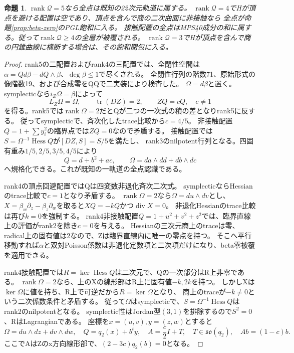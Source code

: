 \documentclass[a4paper,11pt]{ltjsarticle}
\newtheorem{proposition}{命題}[section]
\theoremstyle{definition}
\newcommand{\rank}{\operatorname{rank}}
\begin{document}
\begin{proposition}\label{prop:double-quadric}
$\rank\mathcal Q=5$なら全点は既知の22次元軌道に属する。
$\rank\mathcal Q=4$でHが頂点を避ける配置は空であり、頂点を含んで商の二次曲面に非接触なら
全点が命題\ref{prop:beta-zero}のPGL飽和に入る。
接触配置の全点はMPS40成分の和に属する。従って$\rank\mathcal Q\ge4$の全層が被覆される。
$\rank\mathcal Q=3$でHが頂点を含んで商の円錐曲線に横断する場合は、その飽和閉包に入る。
\end{proposition}
\begin{proof}
rank5の二配置およびrank4の三配置では、全閉性空間は
$\alpha=Qd\beta-dQ\wedge\beta$、$\deg\beta\le1$で尽くされる。
全閉性行列の階数71、原始形式の像階数19、および合成零をQQで二実装により検査した。
$\Omega=d\beta$と置く。symplecticなら$i_Z\Omega=\beta$によって
\[
 L_Z\Omega=\Omega,\qquad \operatorname{tr}(DZ)=2,\qquad ZQ=cQ,\quad c\ne1
\]
を得る。rank5では$\rank\Omega=2$だとQが二つの一次式の積の差となりrank5に反する。
従ってsymplecticで、斉次化したtrace比較から$c=4/5$。
非接触配置$Q=1+\sum y_i^2$の臨界点では$ZQ=0$なので矛盾する。
接触配置では$S=\Omega^{-1}\operatorname{Hess}Q$が$[DZ,S]=S/5$を満たし、
rank3のnilpotent行列となる。四固有重み$1/5,2/5,3/5,4/5$により
\[
 Q=d+b^2+ac,\qquad \Omega=da\wedge dd+db\wedge dc
\]
へ規格化できる。これが既知の一軌道の全点認識である。

rank4の頂点回避配置ではQは四変数非退化斉次二次式。
symplecticならHessianのtrace比較で$c=1$となり矛盾する。
$\rank\Omega=2$なら$\Omega=du\wedge dv$とし、
$X=\beta_w\partial_z-\beta_z\partial_w$を取ると$XQ=-kQ$かつ$\operatorname{div}X=0$。
非退化Hessianのtrace比較は再び$k=0$を強制する。
rank4非接触配置$Q=1+u^2+v^2+z^2$では、臨界直線上の評価がrank2を除き$c=0$を与える。
Hessianの三次元商上のtraceは零、radical上の固有値は2なので、Zは臨界直線内に唯一の零点を持つ。
そこへ平行移動すれば$\alpha$と双対Poisson係数は非退化定数項と二次項だけになり、beta零被覆を適用できる。

rank4接触配置では$R=\ker\operatorname{Hess}Q$は二次元で、Qの一次部分はR上非零である。
$\rank\Omega=2$なら、上のXの線形部はR上に固有値$-k,2k$を持つ。
しかしXは$\ker\Omega$に値を持ち、R上で可逆だから$R=\ker\Omega$となり、
商上のtraceが$-k\ne0$という二次係数条件と矛盾する。
従って$\Omega$はsymplecticで、$S=\Omega^{-1}\operatorname{Hess}Q$はrank2のnilpotentとなる。
symplectic性はJordan型$(3,1)$を排除するので$S^2=0$、RはLagrangianである。
座標を$x=(u,v),y=(z,w)$とすると
\[
 \Omega=du\wedge dz+dv\wedge dw,\quad Q=q_2(x)+b^ty,
 \quad A=\frac c2I+T,\quad T\in\mathfrak{so}(q_2),\quad Ab=(1-c)b.
\]
ここでAはZのx方向線形部で、$(2-3c)q_2(b)=0$となる。


\end{proof}
\end{document}

